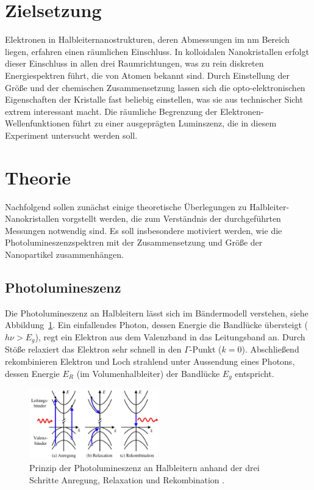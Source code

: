 \setcounter{page}{1}
\section*{Zielsetzung}
Elektronen in Halbleiternanostrukturen, deren Abmessungen im $\si{\nano\meter}$ Bereich liegen,
erfahren einen räumlichen Einschluss. In kolloidalen Nanokristallen erfolgt dieser Einschluss
in allen drei Raumrichtungen, was zu rein diskreten Energiespektren führt, die von Atomen bekannt sind.
Durch Einstellung der Größe und der chemischen Zusammensetzung lassen sich die opto-elektronischen
Eigenschaften der Kristalle fast beliebig einstellen, was sie aus technischer Sicht extrem interessant macht.
Die räumliche Begrenzung der Elektronen-Wellenfunktionen führt zu einer ausgeprägten Luminszenz, die
in diesem Experiment untersucht werden soll.

\section{Theorie}
Nachfolgend sollen zunächst einige theoretische Überlegungen zu Halbleiter-Nanokristallen vorgstellt werden, die
zum Verständnis der durchgeführten Messungen notwendig sind. Es soll insbesondere motiviert werden, wie die
Photolumineszenzspektren mit der Zusammensetzung und Größe der Nanopartikel zusammenhängen.

\subsection{Photolumineszenz}
Die Photolumineszenz an Halbleitern lässt sich im Bändermodell verstehen, siehe Abbildung~\ref{fig: pl}. Ein
einfallendes Photon, dessen Energie die Bandlücke übersteigt ($h\nu > E_g$), regt ein Elektron aus dem
Valenzband in das Leitungsband an.
Durch Stöße relaxiert das Elektron sehr schnell in den $\Gamma$-Punkt ($k = 0$). Abschließend rekombinieren Elektron und Loch
strahlend unter Aussendung eines Photons, dessen Energie $E_R$ (im Volumenhalbleiter) der Bandlücke $E_g$ entspricht.

\begin{figure}
  \centering
  \includegraphics[width = 0.5\textwidth]{pics/PL.png}
  \caption{Prinzip der Photolumineszenz an Halbleitern anhand der drei Schritte Anregung, Relaxation und Rekombination \cite{anleitung_pl}.}
  \label{fig: pl}
\end{figure}


